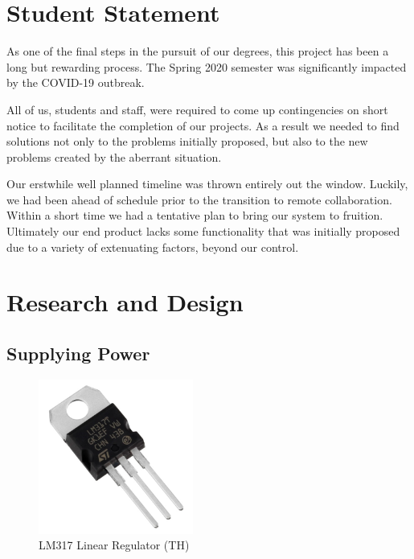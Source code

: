 \documentclass[a4paper,11pt]{report}
\begin{document}
	\section{Student Statement}
	As one of the final steps in the pursuit of our degrees, this project has been a long but rewarding process. The Spring 2020 semester was significantly impacted by the COVID-19 outbreak. 
	\par All of us, students and staff, were required to come up contingencies on short notice to facilitate the completion of our projects. As a result we needed to find solutions not only to the problems initially proposed, but also to the new problems created by the aberrant situation. 
	\par Our erstwhile well planned timeline was thrown entirely out the window. Luckily, we had been ahead of schedule prior to the transition to remote collaboration. Within a short time we had a tentative plan to bring our system to fruition. Ultimately our end product lacks some functionality that was initially proposed due to a variety of extenuating factors, beyond our control. 
	\tableofcontents
	\section{Research and Design}
		\subsection{Supplying Power}
			\begin{figure}
				\includegraphics[width=2in]{lm317.jpg}
				\caption{\small LM317 Linear Regulator (TH)}
			\end{figure}
\end{document}
